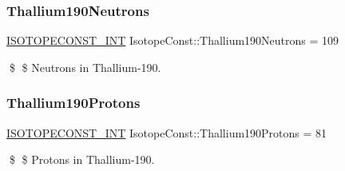 \subsubsection{\texorpdfstring{Thallium190\+Neutrons}{Thallium190Neutrons}}
{\footnotesize\ttfamily \mbox{\hyperlink{group___isotope_const-_macros_ga5f18360b3e99483a35c32d789e62621c}{I\+S\+O\+T\+O\+P\+E\+C\+O\+N\+S\+T\+\_\+\+I\+NT}} Isotope\+Const\+::\+Thallium190\+Neutrons = 109}

\$ \$ Neutrons in Thallium-\/190. \mbox{\label{group___isotope_const-_thallium-_tl190_ga8c568a3b7cc5f44b7bf7be4d999812ca}} 
\subsubsection{\texorpdfstring{Thallium190\+Protons}{Thallium190Protons}}
{\footnotesize\ttfamily \mbox{\hyperlink{group___isotope_const-_macros_ga5f18360b3e99483a35c32d789e62621c}{I\+S\+O\+T\+O\+P\+E\+C\+O\+N\+S\+T\+\_\+\+I\+NT}} Isotope\+Const\+::\+Thallium190\+Protons = 81}

\$ \$ Protons in Thallium-\/190. 
